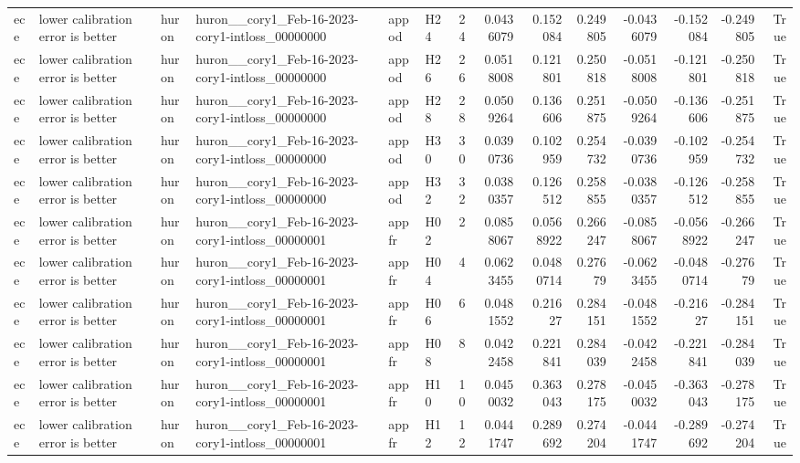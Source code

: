 \begin{longtable}{llllllrrrrrrrr}
ece & lower calibration error is better & huron & huron\_\_cory1\_Feb-16-2023-cory1-intloss\_00000000 & appod & H24 & 24 & 0.0436079 & 0.152084 & 0.249805 & -0.0436079 & -0.152084 & -0.249805 & True \\
ece & lower calibration error is better & huron & huron\_\_cory1\_Feb-16-2023-cory1-intloss\_00000000 & appod & H26 & 26 & 0.0518008 & 0.121801 & 0.250818 & -0.0518008 & -0.121801 & -0.250818 & True \\
ece & lower calibration error is better & huron & huron\_\_cory1\_Feb-16-2023-cory1-intloss\_00000000 & appod & H28 & 28 & 0.0509264 & 0.136606 & 0.251875 & -0.0509264 & -0.136606 & -0.251875 & True \\
ece & lower calibration error is better & huron & huron\_\_cory1\_Feb-16-2023-cory1-intloss\_00000000 & appod & H30 & 30 & 0.0390736 & 0.102959 & 0.254732 & -0.0390736 & -0.102959 & -0.254732 & True \\
ece & lower calibration error is better & huron & huron\_\_cory1\_Feb-16-2023-cory1-intloss\_00000000 & appod & H32 & 32 & 0.0380357 & 0.126512 & 0.258855 & -0.0380357 & -0.126512 & -0.258855 & True \\
ece & lower calibration error is better & huron & huron\_\_cory1\_Feb-16-2023-cory1-intloss\_00000001 & appfr & H02 & 2 & 0.0858067 & 0.0568922 & 0.266247 & -0.0858067 & -0.0568922 & -0.266247 & True \\
ece & lower calibration error is better & huron & huron\_\_cory1\_Feb-16-2023-cory1-intloss\_00000001 & appfr & H04 & 4 & 0.0623455 & 0.0480714 & 0.27679 & -0.0623455 & -0.0480714 & -0.27679 & True \\
ece & lower calibration error is better & huron & huron\_\_cory1\_Feb-16-2023-cory1-intloss\_00000001 & appfr & H06 & 6 & 0.0481552 & 0.21627 & 0.284151 & -0.0481552 & -0.21627 & -0.284151 & True \\
ece & lower calibration error is better & huron & huron\_\_cory1\_Feb-16-2023-cory1-intloss\_00000001 & appfr & H08 & 8 & 0.0422458 & 0.221841 & 0.284039 & -0.0422458 & -0.221841 & -0.284039 & True \\
ece & lower calibration error is better & huron & huron\_\_cory1\_Feb-16-2023-cory1-intloss\_00000001 & appfr & H10 & 10 & 0.0450032 & 0.363043 & 0.278175 & -0.0450032 & -0.363043 & -0.278175 & True \\
ece & lower calibration error is better & huron & huron\_\_cory1\_Feb-16-2023-cory1-intloss\_00000001 & appfr & H12 & 12 & 0.0441747 & 0.289692 & 0.274204 & -0.0441747 & -0.289692 & -0.274204 & True \\

\end{longtable}
